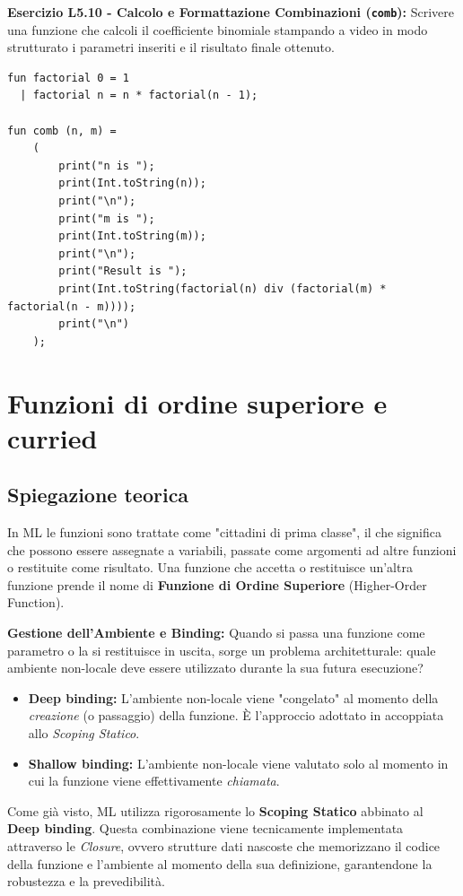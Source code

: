 \documentclass[12pt, a4paper]{article}
\begin{document}
\textbf{Esercizio L5.10 - Calcolo e Formattazione Combinazioni (\texttt{comb}):}
Scrivere una funzione che calcoli il coefficiente binomiale stampando a video in modo strutturato i parametri inseriti e il risultato finale ottenuto.
\begin{verbatim}
fun factorial 0 = 1
  | factorial n = n * factorial(n - 1);

fun comb (n, m) =
    (
        print("n is ");
        print(Int.toString(n));
        print("\n");
        print("m is ");
        print(Int.toString(m));
        print("\n");
        print("Result is ");
        print(Int.toString(factorial(n) div (factorial(m) * factorial(n - m))));
        print("\n")
    );
\end{verbatim}

\section{Funzioni di ordine superiore e curried}

\subsection{Spiegazione teorica}
In ML le funzioni sono trattate come "cittadini di prima classe", il che significa che possono essere assegnate a variabili, passate come argomenti ad altre funzioni o restituite come risultato. Una funzione che accetta o restituisce un'altra funzione prende il nome di \textbf{Funzione di Ordine Superiore} (Higher-Order Function).

\textbf{Gestione dell'Ambiente e Binding:}
Quando si passa una funzione come parametro o la si restituisce in uscita, sorge un problema architetturale: quale ambiente non-locale deve essere utilizzato durante la sua futura esecuzione?
\begin{itemize}
    \item \textbf{Deep binding:} L'ambiente non-locale viene "congelato" al momento della \textit{creazione} (o passaggio) della funzione. È l'approccio adottato in accoppiata allo \textit{Scoping Statico}.
    \item \textbf{Shallow binding:} L'ambiente non-locale viene valutato solo al momento in cui la funzione viene effettivamente \textit{chiamata}.
\end{itemize}
Come già visto, ML utilizza rigorosamente lo \textbf{Scoping Statico} abbinato al \textbf{Deep binding}. Questa combinazione viene tecnicamente implementata attraverso le \textit{Closure}, ovvero strutture dati nascoste che memorizzano il codice della funzione e l'ambiente al momento della sua definizione, garantendone la robustezza e la prevedibilità.
\end{document}
